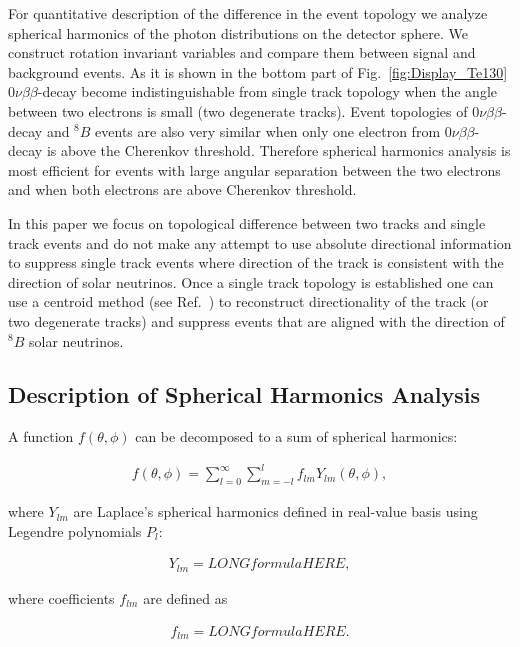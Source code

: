 \documentclass[12pt,twoside,letterpaper]{article}
\newcommand{\vbb}{0\nu\beta\beta}
\newcommand{\B}{^{8}B}
\begin{document}
For quantitative description of the difference in the event topology we analyze spherical harmonics of the photon distributions on the detector sphere. We construct rotation invariant variables and compare them between signal and background events. As it is shown in the bottom part of Fig.~\ref{fig:Display_Te130} $\vbb$-decay become indistinguishable from single track topology when the angle between two electrons is small (two degenerate tracks). Event topologies of $\vbb$-decay and $\B$ events are also very similar when only one electron from $\vbb$-decay is above the Cherenkov threshold. Therefore spherical harmonics analysis is most efficient for events with large angular separation between the two electrons and when both electrons are above Cherenkov threshold. 

In this paper we focus on topological difference between two tracks and single track events and do not make any attempt to use absolute directional information to suppress single track events  where direction of the track is consistent with the direction of solar neutrinos. Once a single track topology is established one can use a centroid method (see Ref.~\cite{Directionality}) to reconstruct directionality of the track (or two degenerate tracks) and suppress events that are aligned with the direction of $\B$ solar neutrinos.

\subsection{Description of Spherical Harmonics Analysis}
A function $f(\theta,\phi)$ can be decomposed to a sum of spherical harmonics:

\begin{eqnarray}
\label{eq1}
f(\theta,\phi) = \sum_{l=0}^{\infty} \sum_{m=-l}^{l} f_{lm} Y_{lm}(\theta,\phi),
\end{eqnarray}

where $Y_{lm}$ are Laplace's spherical harmonics defined in real-value basis using Legendre polynomials $P_l$:

\begin{eqnarray}
\label{eq2}
Y_{lm} = LONGformulaHERE,
\end{eqnarray}

 where  coefficients $f_{lm}$ are defined as
 
\begin{eqnarray}
\label{eq3}
f_{lm} = LONGformulaHERE.
\end{eqnarray}
\end{document}
